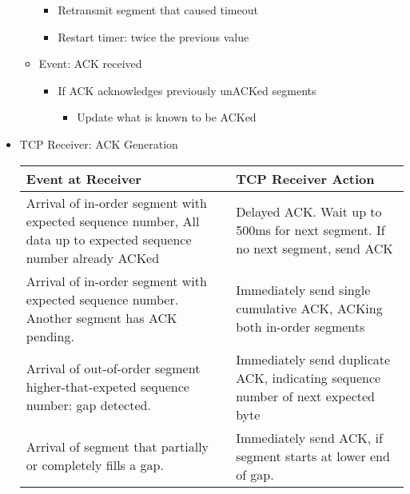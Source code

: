 \begin{itemize}
\begin{itemize}
        \begin{itemize}

          \item Retransmit segment that caused timeout

          \item Restart timer: twice the previous value

        \end{itemize}

      \item Event: ACK received

        \begin{itemize}

          \item If ACK acknowledges previously unACKed segments

            \begin{itemize}

              \item Update what is known to be ACKed

            \end{itemize}

        \end{itemize}

    \end{itemize}

  \item TCP Receiver: ACK Generation

    \begin{center}
      \begin{tabular}[H]{|p{}|p{}|}
        \hline
        Event at Receiver & TCP Receiver Action\\
        \hline
        Arrival of in-order segment with expected sequence number, All data up to expected sequence number already ACKed & Delayed ACK. Wait up to 500ms for next segment. If no next segment, send ACK\\
        \hline
        Arrival of in-order segment with expected sequence number. Another segment has ACK pending. & Immediately send single cumulative ACK, ACKing both in-order segments\\
        \hline
        Arrival of out-of-order segment higher-that-expeted sequence number: gap detected. & Immediately send duplicate ACK, indicating sequence number of next expected byte\\
        \hline
        Arrival of segment that partially or completely fills a gap. & Immediately send ACK, if segment starts at lower end of gap.\\
        \hline
      \end{tabular}
    \end{center}


\end{itemize}
